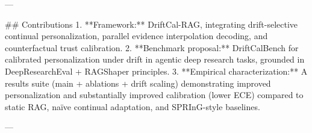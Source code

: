 ---

## Contributions  
1. **Framework:** DriftCal-RAG, integrating drift-selective continual personalization, parallel evidence interpolation decoding, and counterfactual trust calibration.  
2. **Benchmark proposal:** DriftCalBench for calibrated personalization under drift in agentic deep research tasks, grounded in DeepResearchEval + RAGShaper principles.  
3. **Empirical characterization:** A results suite (main + ablations + drift scaling) demonstrating improved personalization and substantially improved calibration (lower ECE) compared to static RAG, naïve continual adaptation, and SPRInG-style baselines.

---